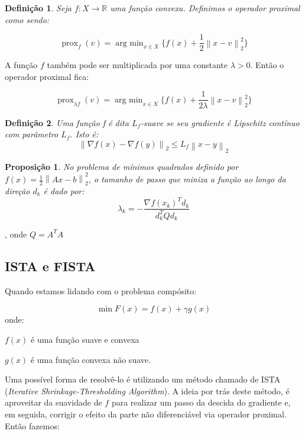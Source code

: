 \documentclass[12pt]{article}
\newtheorem{definition}{Definição}
\newtheorem{proposition}{Proposição}
\newtheorem{example}{Exemplo}
\DeclareMathOperator{\prox}{prox}
\DeclareMathOperator*{\argmin}{arg\ min}
\newcommand{\norm}[1]{\left\lVert#1\right\rVert}
\begin{document}




\begin{definition}
Seja $f : X \to \mathbb{R}$ uma função convexa. Definimos o operador proximal como sendo:

\[
\prox_f(v) = \argmin_{x\in X}\{f(x) + \frac{1}{2}\norm{x - v}_2^2 \} 
\]
\end{definition}
A função $f$ também pode ser multiplicada por uma constante $\lambda > 0$. Então o operador proximal fica:

\[
\prox_{\lambda f}(v) = \argmin_{x\in X}\{f(x) + \frac{1}{2\lambda}\norm{x - v}_2^2 \} 
\]

\begin{definition}
Uma função f é dita $L_f$-suave se seu gradiente é Lipschitz contínuo com parâmetro $L_f$. Isto é:
    \[
    \norm{\nabla f(x) - \nabla f(y)}_2 \leq L_f \norm{x - y}_2
    \]
\end{definition}

\begin{proposition}
No problema de mínimos quadrados definido por $f(x) = \frac{1}{2} \norm{Ax - b}_2^2$, o tamanho de passo que miniza a função ao longo da direção $d_k$ é dado por:
\[
\lambda_k = -\frac{\nabla f(x_k)^T d_k}{d_k^T Qd_k}
\]
\end{proposition}, onde $Q = A^TA$

\subsection{ISTA e FISTA}
\label{problema}
Quando estamos lidando com o problema compósito:

\[
\min F(x) = f(x) + \gamma g(x)
\]
onde:
 
$f(x)$ é uma função suave e convexa


$g(x)$ é uma função convexa não suave.

Uma possível forma de resolvê-lo é utilizando um método chamado de ISTA (\textit{Iterative Shrinkage-Thresholding Algorithm}). A ideia por trás deste método, é aproveitar da suavidade de $f$ para realizar um passo da descida do gradiente e, em seguida, corrigir o efeito da parte não diferenciável via operador proximal. Então fazemos:
\end{document}
